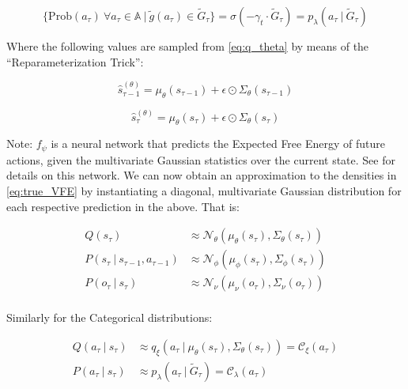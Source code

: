 \documentclass{article}
\begin{document}
\begin{equation}
    \label{eq:var_action_post}
    \{\text{Prob}(a_{\tau}) \ \forall a_{\tau} \in \mathbb{A} \ | \ \tilde{g}(a_{\tau}) \in \tilde{G}_{\tau}\} = \sigma(-\gamma_t \cdot \tilde{G}_{\tau}) = p_{\lambda}(a_{\tau} \ | \ \tilde{G}_{\tau})
\end{equation}

Where the following values are sampled from \ref{eq:q_theta} by means of the ``Reparameterization Trick'':

\begin{equation}
    \label{eq:q_phi_prev_sample}
    \hat{s}_{\tau - 1}^{(\theta)} = \mu_{\theta}(s_{\tau - 1}) + \epsilon \odot \Sigma_{\theta}(s_{\tau - 1})
\end{equation}

\begin{equation}
    \label{eq:q_phi_curr_sample}
    \hat{s}_{\tau}^{(\theta)} = \mu_{\theta}(s_{\tau}) + \epsilon \odot \Sigma_{\theta}(s_{\tau})
\end{equation}

Note: $f_{\psi}$ is a neural network that predicts the Expected Free Energy of future actions, given the multivariate Gaussian statistics over the current state. See \cite{DEEP-AIF-For-POMDPs} for details on this network. We can now obtain an approximation to the densities in \ref{eq:true_VFE} by instantiating a diagonal, multivariate Gaussian distribution for each respective prediction in the above. That is:

\begin{equation}
    \begin{aligned}
        \label{eq:approx_Gauss}
        Q(s_{\tau}) &\approx \mathcal{N}_{\theta}(\mu_{\theta}(s_{\tau}), \Sigma_{\theta}(s_{\tau})) \\
        P(s_{\tau} \ | \ s_{\tau - 1}, a_{\tau - 1}) &\approx \mathcal{N}_{\phi}(\mu_{\phi}(s_{\tau}), \Sigma_{\phi}(s_{\tau})) \\
        P(o_{\tau} \ | \ s_{\tau}) &\approx \mathcal{N}_{\nu}(\mu_{\nu}(o_{\tau}), \Sigma_{\nu}(o_{\tau})) \\
    \end{aligned}
\end{equation}

Similarly for the Categorical distributions:

\begin{equation}
    \begin{aligned}
        \label{eq:approx_Cat}
        Q(a_{\tau} \ | \ s_{\tau}) &\approx q_{\xi}(a_{\tau} \ | \ \mu_{\theta}(s_{\tau}), \Sigma_{\theta}(s_{\tau})) = \mathcal{C}_{\xi}(a_{\tau}) \\
        P(a_{\tau} \ | \ s_{\tau}) &\approx p_{\lambda}(a_{\tau} \ | \ \tilde{G}_{\tau}) = \mathcal{C}_{\lambda}(a_{\tau})
    \end{aligned}
\end{equation}
\end{document}
